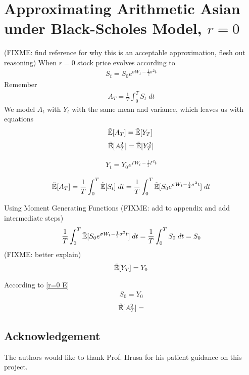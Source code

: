 \documentclass[reqno]{amsart}
\newcommand{\Expect}[1]{\tilde{\E}[#1]}
\begin{document}
\section{Approximating Arithmetic Asian under Black-Scholes Model, $r=0$}
(FIXME: find reference for why this is an acceptable approximation, flesh out reasoning)
When $r=0$ stock price evolves according to
\begin{align} 
     S_t = S_0e^{\sigma W_t-\frac{1}{2}\sigma^2t}
\end{align}
Remember
\begin{align}
     A_T = \frac{1}{T}\int_0^T S_t \; dt
\end{align}
We model $A_t$ with $Y_t$ with the same mean and variance, which leaves us with equations
\begin{align} \label{r=0 E}
     \tilde{\mathbb{E}}[A_T] = \tilde{\mathbb{E}}[Y_T] \; 
\end{align}
\begin{align} \label{r=0 E^2}
     \tilde{\mathbb{E}}[A_T^2] = \tilde{\mathbb{E}}[Y_T^2]
\end{align}

\begin{align} 
     Y_t = Y_0e^{\Gamma W_t-\frac{1}{2}\Gamma^2t}
\end{align}

\begin{align} 
     \Expect{A_T} = \frac{1}{T} \int_0^T \tilde{\E}[S_t] \; dt = \frac{1}{T} \int_0^T \tilde{\E}[S_0 e^{\sigma W_t-\frac{1}{2}\sigma^2t}] \; dt
\end{align}

Using Moment Generating Functions (FIXME: add to appendix and add intermediate steps)
\begin{align} 
     \frac{1}{T} \int_0^T \Expect{S_0 e^{\sigma W_t-\frac{1}{2}\sigma^2t}} \; dt 
     = \frac{1}{T} \int_0^T S_0 \; dt
     = S_0
\end{align}
(FIXME: better explain)
\begin{align} 
     \Expect{Y_T} = Y_0 
\end{align}

According to \eqref{r=0 E}
\begin{align} 
     S_0 = Y_0
\end{align}
\begin{align}
     \Expect{A_T^2} = 
\end{align}


\subsection*{Acknowledgement} The authors would like to thank Prof. Hrusa for his patient guidance on this project.  
\end{document}
